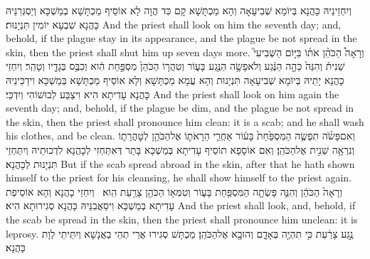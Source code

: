 {וְיִחְזֵינֵיהּ כָּהֲנָא בְּיוֹמָא שְׁבִיעָאָה וְהָא מַכְתָּשָׁא קָם כִּד הֲוָה לָא אוֹסֵיף מַכְתָּשָׁא בְמַשְׁכָּא וְיַסְגְּרִנֵּיהּ כָּהֲנָא שִׁבְעָא יוֹמִין תִּנְיָנוּת׃}
{And the priest shall look on him the seventh day; and, behold, if the plague stay in its appearance, and the plague be not spread in the skin, then the priest shall shut him up seven days more.}{}
{וְרָאָה֩ הַכֹּהֵ֨ן אֹת֜וֹ בַּיּ֣וֹם הַשְּׁבִיעִי֮ שֵׁנִית֒ וְהִנֵּה֙ כֵּהָ֣ה הַנֶּ֔גַע וְלֹא\maqqaf פָשָׂ֥ה הַנֶּ֖גַע בָּע֑וֹר וְטִהֲר֤וֹ הַכֹּהֵן֙ מִסְפַּ֣חַת הִ֔וא וְכִבֶּ֥ס בְּגָדָ֖יו וְטָהֵֽר׃}
{וְיִחְזֵי כָהֲנָא יָתֵיהּ בְּיוֹמָא שְׁבִיעָאָה תִּנְיָנוּת וְהָא עֲמָא מַכְתָּשָׁא וְלָא אוֹסֵיף מַכְתָּשָׁא בְּמַשְׁכָּא וִידַכֵּינֵיהּ כָּהֲנָא עָדִיתָא הִיא וִיצַבַּע לְבוּשׁוֹהִי וְיִדְכֵּי׃}
{And the priest shall look on him again the seventh day; and, behold, if the plague be dim, and the plague be not spread in the skin, then the priest shall pronounce him clean: it is a scab; and he shall wash his clothes, and be clean.}{}
{וְאִם\maqqaf פָּשֹׂ֨ה תִפְשֶׂ֤ה הַמִּסְפַּ֙חַת֙ בָּע֔וֹר אַחֲרֵ֧י הֵרָאֹת֛וֹ אֶל\maqqaf הַכֹּהֵ֖ן לְטׇהֳרָת֑וֹ וְנִרְאָ֥ה שֵׁנִ֖ית אֶל\maqqaf הַכֹּהֵֽן׃}
{וְאִם אוֹסָפָא תוֹסֵיף עָדִיתָא בְּמַשְׁכָּא בָּתַר דְּאִתַּחְזִי לְכָהֲנָא לִדְכוּתֵיהּ וְיִתַּחְזֵי תִּנְיָנוּת לְכָהֲנָא׃}
{But if the scab spread abroad in the skin, after that he hath shown himself to the priest for his cleansing, he shall show himself to the priest again.}{}
{וְרָאָה֙ הַכֹּהֵ֔ן וְהִנֵּ֛ה פָּשְׂתָ֥ה הַמִּסְפַּ֖חַת בָּע֑וֹר וְטִמְּא֥וֹ הַכֹּהֵ֖ן צָרַ֥עַת הִֽוא׃ \petucha }
{וְיִחְזֵי כָהֲנָא וְהָא אוֹסֵיפַת עָדִיתָא בְּמַשְׁכָּא וִיסַאֲבִנֵּיהּ כָּהֲנָא סְגִירוּתָא הִיא׃}
{And the priest shall look, and, behold, if the scab be spread in the skin, then the priest shall pronounce him unclean: it is leprosy.}{}
{נֶ֣גַע צָרַ֔עַת כִּ֥י תִהְיֶ֖ה בְּאָדָ֑ם וְהוּבָ֖א אֶל\maqqaf הַכֹּהֵֽן׃}
{מַכְתָּשׁ סְגִירוּ אֲרֵי תְהֵי בַאֲנָשָׁא וְיִתֵּיתֵי לְוָת כָּהֲנָא׃}
